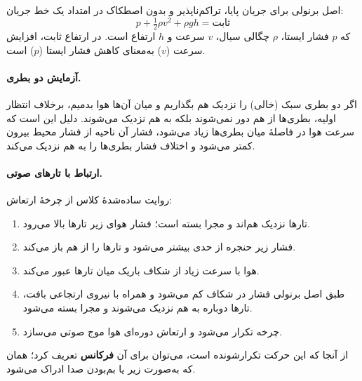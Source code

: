 \begin{definitionbox}{اصل برنولی}
برای جریان پایا، تراکم‌ناپذیر و بدون اصطکاک در امتداد یک خط جریان:
\[
p + \tfrac{1}{2}\rho v^2 + \rho g h = \text{ثابت}
\]
که $p$ فشار ایستا، $\rho$ چگالی سیال، $v$ سرعت و $h$ ارتفاع است. در ارتفاع ثابت، افزایش سرعت ($v$) به‌معنای کاهش فشار ایستا ($p$) است.
\end{definitionbox}

\paragraph{آزمایش دو بطری.} اگر دو بطری سبک (خالی) را نزدیک هم بگذاریم و میان آن‌ها هوا بدمیم، برخلاف انتظار اولیه، بطری‌ها از هم دور نمی‌شوند بلکه به هم نزدیک می‌شوند. دلیل این است که سرعت هوا در فاصلهٔ میان بطری‌ها زیاد می‌شود، فشار آن ناحیه از فشار محیط بیرون کمتر می‌شود و اختلاف فشار بطری‌ها را به هم نزدیک می‌کند.

\paragraph{ارتباط با تارهای صوتی.} روایت ساده‌شدهٔ کلاس از چرخهٔ ارتعاش:
\begin{enumerate}
  \item تارها نزدیک هم‌اند و مجرا بسته است؛ فشار هوای زیر تارها بالا می‌رود.
  \item فشار زیر حنجره از حدی بیشتر می‌شود و تارها را از هم باز می‌کند.
  \item هوا با سرعت زیاد از شکاف باریک میان تارها عبور می‌کند.
  \item طبق اصل برنولی فشار در شکاف کم می‌شود و همراه با نیروی ارتجاعی بافت، تارها دوباره به هم نزدیک می‌شوند و مجرا بسته می‌شود.
  \item چرخه تکرار می‌شود و ارتعاش دوره‌ای هوا موج صوتی می‌سازد.
\end{enumerate}
از آنجا که این حرکت تکرارشونده است، می‌توان برای آن \textbf{فرکانس} تعریف کرد؛ همان  که به‌صورت زیر یا بم‌بودن صدا ادراک می‌شود.

\label{fig:ch02-fold-cycle}

